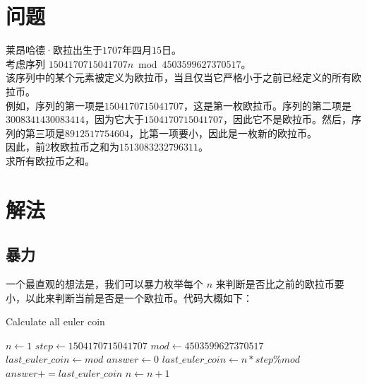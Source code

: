 \documentclass{article}
\begin{document}
\begin{CJK}{UTF8}{gbsn}
\setlength{\parindent}{0pt}
\section{问题}

莱昂哈德·欧拉出生于$1707$年四月$15$日。\\

考虑序列 $1504170715041707n \bmod 4503599627370517$。\\

该序列中的某个元素被定义为欧拉币，当且仅当它严格小于之前已经定义的所有欧拉币。\\

例如，序列的第一项是$1504170715041707$，这是第一枚欧拉币。序列的第二项是$3008341430083414$，因为它大于$1504170715041707$，因此它不是欧拉币。然后，序列的第三项是$8912517754604$，比第一项要小，因此是一枚新的欧拉币。\\

因此，前$2$枚欧拉币之和为$1513083232796311$。\\

求所有欧拉币之和。

\section{解法}

\subsection{暴力}

一个最直观的想法是，我们可以暴力枚举每个 $n$ 来判断是否比之前的欧拉币要小，以此来判断当前是否是一个欧拉币。代码大概如下：

\begin{algorithm}
\caption{Calculate all euler coin}
\begin{algorithmic}
\STATE $n \gets 1$
\STATE $step \gets 1504170715041707$
\STATE $mod \gets 4503599627370517$
\STATE $last\_euler\_coin \gets mod$
\STATE $answer \gets 0$
		\STATE $last\_euler\_coin \gets n*step\%mod$
		\STATE $answer += last\_euler\_coin$
	\ENDIF
	\STATE $n \gets n+1$
\ENDWHILE
\end{algorithmic}
\end{algorithm}


\end{CJK}
\end{document}
